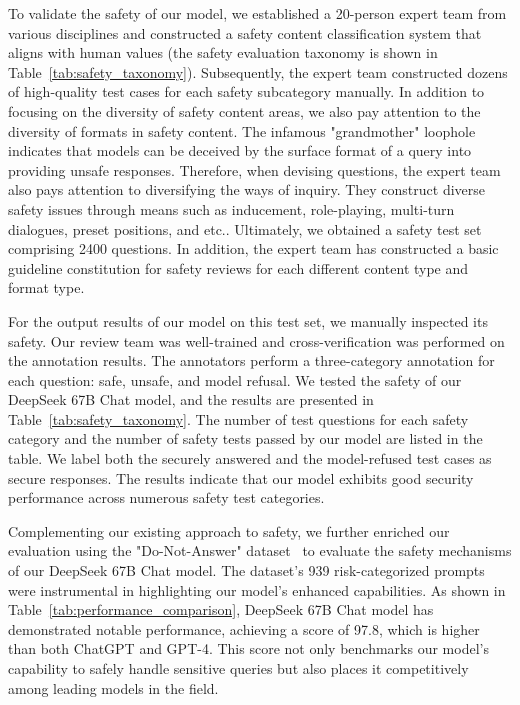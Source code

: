 To validate the safety of our model, we established a 20-person expert team from various disciplines and constructed a safety content classification system that aligns with human values (the safety evaluation taxonomy is shown in Table~\ref{tab:safety_taxonomy}). Subsequently, the expert team constructed dozens of high-quality test cases for each safety subcategory manually. In addition to focusing on the diversity of safety content areas, we also pay attention to the diversity of formats in safety content. The infamous "grandmother" loophole indicates that models can be deceived by the surface format of a query into providing unsafe responses. Therefore, when devising questions, the expert team also pays attention to diversifying the ways of inquiry. They construct diverse safety issues through means such as inducement, role-playing, multi-turn dialogues, preset positions, and etc.. Ultimately, we obtained a safety test set comprising 2400 questions. In addition, the expert team has constructed a basic guideline constitution for safety reviews for each different content type and format type.

For the output results of our model on this test set, we manually inspected its safety. Our review team was well-trained and cross-verification was performed on the annotation results. The annotators perform a three-category annotation for each question: safe, unsafe, and model refusal. We tested the safety of our DeepSeek 67B Chat model, and the results are presented in Table~\ref{tab:safety_taxonomy}. 
The number of test questions for each safety category and the number of safety tests passed by our model are listed in the table. We label both the securely answered and the model-refused test cases as secure responses. The results indicate that our model exhibits good security performance across numerous safety test categories.

Complementing our existing approach to safety, we further enriched our evaluation using the "Do-Not-Answer" dataset~\citep{donotanswer} to evaluate the safety mechanisms of our DeepSeek 67B Chat model. The dataset's 939 risk-categorized prompts were instrumental in highlighting our model's enhanced capabilities. As shown in Table~\ref{tab:performance_comparison}, DeepSeek 67B Chat model has demonstrated notable performance, achieving a score of 97.8, which is higher than both ChatGPT and GPT-4. This score not only benchmarks our model's capability to safely handle sensitive queries but also places it competitively among leading models in the field. 

